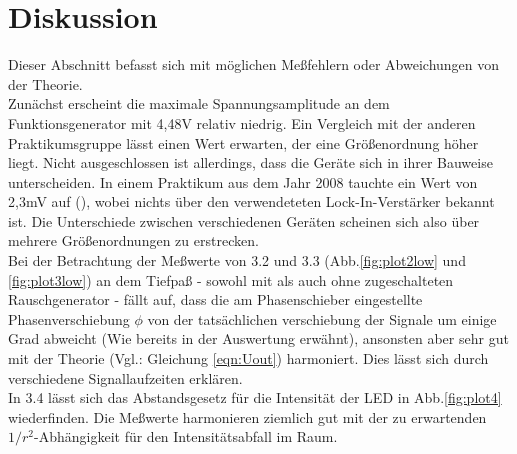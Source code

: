 \section{Diskussion}
\label{sec:Diskussion}
Dieser Abschnitt befasst sich mit möglichen Meßfehlern oder Abweichungen
von der Theorie.\\

Zunächst erscheint die maximale Spannungsamplitude an dem Funktionsgenerator mit
4,48V relativ niedrig. Ein Vergleich mit der anderen Praktikumsgruppe lässt
einen Wert erwarten, der eine Größenordnung höher liegt. Nicht ausgeschlossen
ist allerdings, dass die Geräte sich in ihrer Bauweise unterscheiden. In
einem Praktikum aus dem Jahr 2008 tauchte ein Wert von 2,3mV
auf (\cite{Protokoll}), wobei nichts
über den verwendeteten Lock-In-Verstärker bekannt ist. Die Unterschiede
zwischen verschiedenen Geräten scheinen sich also über mehrere Größenordnungen
zu erstrecken.\\

Bei der Betrachtung der Meßwerte von 3.2 und 3.3 (Abb.\ref{fig:plot2low} und
\ref{fig:plot3low})
an dem Tiefpaß - sowohl mit als auch ohne zugeschalteten
Rauschgenerator - fällt auf, dass die am Phasenschieber eingestellte
Phasenverschiebung $\phi$ von der tatsächlichen verschiebung der Signale
um einige Grad abweicht (Wie bereits in der Auswertung erwähnt), ansonsten
aber sehr gut mit der Theorie (Vgl.: Gleichung \ref{eqn:Uout}) harmoniert.
Dies lässt sich durch verschiedene Signallaufzeiten erklären.\\

In 3.4 lässt sich das Abstandsgesetz für die Intensität der LED in
Abb.\ref{fig:plot4} wiederfinden. Die Meßwerte harmonieren ziemlich gut mit der
zu erwartenden $1/r^2$-Abhängigkeit für den Intensitätsabfall im Raum.
